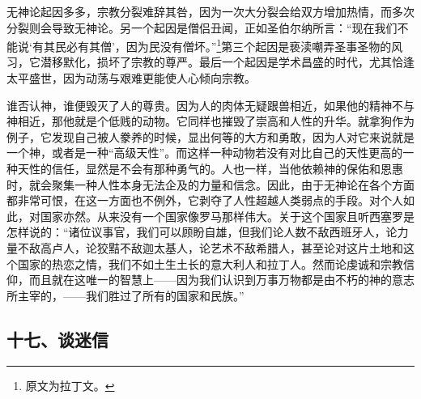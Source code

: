 \par 无神论起因多多，宗教分裂难辞其咎，因为一次大分裂会给双方增加热情，而多次分裂则会导致无神论。另一个起因是僧侣丑闻，正如圣伯尔纳所言：“现在我们不能说‘有其民必有其僧’，因为民没有僧坏。”\footnote{原文为拉丁文。}第三个起因是亵渎嘲弄圣事圣物的风习，它潜移默化，损坏了宗教的尊严。最后一个起因是学术昌盛的时代，尤其恰逢太平盛世，因为动荡与艰难更能使人心倾向宗教。
\par 谁否认神，谁便毁灭了人的尊贵。因为人的肉体无疑跟兽相近，如果他的精神不与神相近，那他就是个低贱的动物。它同样也摧毁了崇高和人性的升华。就拿狗作为例子，它发现自己被人豢养的时候，显出何等的大方和勇敢，因为人对它来说就是一个神，或者是一种“高级天性”。而这样一种动物若没有对比自己的天性更高的一种天性的信任，显然是不会有那种勇气的。人也一样，当他依赖神的保佑和恩惠时，就会聚集一种人性本身无法企及的力量和信念。因此，由于无神论在各个方面都非常可恨，在这一方面也不例外，它剥夺了人性超越人类弱点的手段。对个人如此，对国家亦然。从来没有一个国家像罗马那样伟大。关于这个国家且听西塞罗是怎样说的：“诸位议事官，我们可以顾盼自雄，但我们论人数不敌西班牙人，论力量不敌高卢人，论狡黠不敌迦太基人，论艺术不敌希腊人，甚至论对这片土地和这个国家的热恋之情，我们不如土生土长的意大利人和拉丁人。然而论虔诚和宗教信仰，而且就在这唯一的智慧上——因为我们认识到万事万物都是由不朽的神的意志所主宰的，——我们胜过了所有的国家和民族。”



\subsection*{十七、谈迷信}

